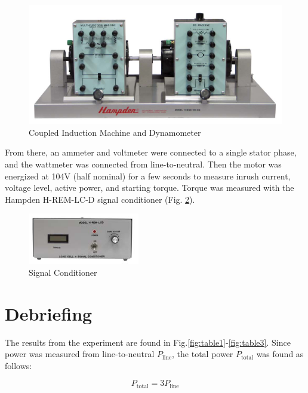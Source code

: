 \documentclass{IEEEtran}
\begin{document}
\begin{figure}[h!]
    \includegraphics[width=\columnwidth]{coupled.png}
    \caption{Coupled Induction Machine and Dynamometer}
    \centering
    \label{fig:coupled}
\end{figure}

From there, an ammeter and voltmeter were connected to a single stator phase, and the wattmeter was connected from line-to-neutral. Then the motor was energized at 104V (half nominal) for a few seconds to measure inrush current, voltage level, active power, and starting torque. Torque was measured with the Hampden H-REM-LC-D signal conditioner (Fig. \ref{fig:torque}).

\begin{figure}[h!]
    \centering
    \includegraphics[width=0.5\columnwidth]{torque.png}
    \caption{Signal Conditioner}
    \label{fig:torque}
\end{figure}

\section{Debriefing}

The results from the experiment are found in Fig.\ref{fig:table1}-\ref{fig:table3}. Since power was measured from line-to-neutral \(P_{\text{line}}\), the total power \(P_{\text{total}}\)  was found as follows:

\begin{equation}
    P_{\text{total}} = 3P_{\text{line}}
\end{equation}
\end{document}
